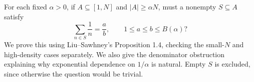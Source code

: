 For each fixed $\alpha>0$, if $A\subseteq[1,N]$ and $|A|\ge\alpha N$, must a nonempty $S\subseteq A$ satisfy
\[
 \sum_{n\in S}\frac1n=\frac ab,\qquad1\le a\le b\le B(\alpha)?
\]
We prove this using Liu--Sawhney's Proposition 1.4, checking the small-$N$ and high-density cases separately. We also give the denominator obstruction explaining why exponential dependence on $1/\alpha$ is natural. Empty $S$ is excluded, since otherwise the question would be trivial.
